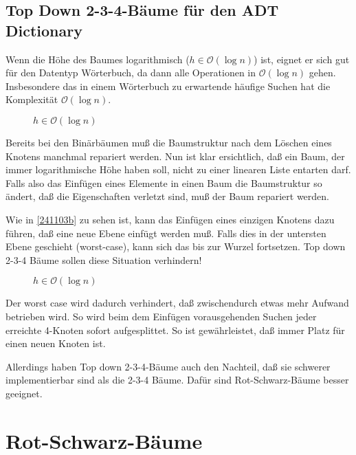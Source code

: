 \documentclass[ngerman,draft,parskip=half*,twoside]{scrreprt}
\theoremstyle{break}
\theoremstyle{nonumberbreak}
\newcommand*{\OO}{\mathcal{O}}      %
\begin{document}
\subsection{Top Down 2-3-4-Bäume für den ADT Dictionary}

Wenn die Höhe des Baumes logarithmisch ($h \in \OO(\log n)$) ist, eignet er sich gut für den Datentyp
Wörterbuch, da dann alle Operationen in $\OO(\log n)$ gehen. Insbesondere das in einem Wörterbuch zu erwartende häufige Suchen hat
die Komplexität $\OO(\log n)$.

\begin{figure}[H]
    \centering
    \caption{$h \in \OO(\log n)$}
    \label{241103a}
 \end{figure}	

Bereits bei den Binärbäumen muß die Baumstruktur nach dem Löschen eines Knotens manchmal repariert werden.
Nun ist klar ersichtlich, daß ein Baum, der immer logarithmische Höhe haben soll, nicht zu einer linearen Liste entarten darf. 	
Falls also das Einfügen eines Elemente in einen Baum die Baumstruktur so ändert, daß die Eigenschaften 
verletzt sind, muß der Baum repariert werden.

Wie in \autoref{241103b} zu sehen ist, kann das Einfügen eines einzigen Knotens dazu führen, daß eine neue Ebene
einfügt werden muß. Falls dies in der untersten Ebene geschieht (worst-case), kann sich das bis zur Wurzel fortsetzen.	
Top down 2-3-4 Bäume sollen diese Situation verhindern! 
 
 \begin{figure}[H]
    \centering
    \caption{$h \in \OO(\log n)$}
    \label{241103b}
 \end{figure}

Der worst case wird dadurch verhindert, daß zwischendurch etwas mehr Aufwand betrieben wird.
So wird beim dem Einfügen vorausgehenden Suchen jeder erreichte 4-Knoten sofort aufgesplittet.
So ist gewährleistet, daß immer Platz für einen neuen Knoten ist.

Allerdings haben Top down 2-3-4-Bäume auch den Nachteil, daß sie schwerer implementierbar sind als die 2-3-4 Bäume. 
    Dafür sind Rot-Schwarz-Bäume besser geeignet. %

\section{Rot-Schwarz-Bäume}
 
\end{document}
